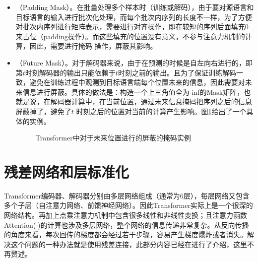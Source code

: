 \begin{itemize}
\vspace{0.5em}
\item {\small{}}（Padding Mask）。在批量处理多个样本时（训练或解码），由于要对源语言和目标语言的输入进行批次化处理，而每个批次内序列的长度不一样，为了方便对批次内序列进行矩阵表示，需要进行对齐操作，即在较短的序列后面填充0来占位（padding操作）。而这些填充的位置没有意义，不参与注意力机制的计算，因此，需要进行掩码 操作，屏蔽其影响。
\vspace{0.5em}
\item {\small{}}（Future Mask）。对于解码器来说，由于在预测的时候是自左向右进行的，即第$t$时刻解码器的输出只能依赖于$t$时刻之前的输出。且为了保证训练解码一致，避免在训练过程中观测到目标语言端每个位置未来的信息，因此需要对未来信息进行屏蔽。具体的做法是：构造一个上三角值全为-inf的Mask矩阵，也就是说，在解码器计算中，在当前位置，通过未来信息掩码把序列之后的信息屏蔽掉了，避免了$t$ 时刻之后的位置对当前的计算产生影响。图\ref{fig:12-13}给出了一个具体的实例。

\begin{figure}[htp]
\centering

\caption{Transformer中对于未来位置进行的屏蔽的掩码实例}
\label{fig:12-13}
\end{figure}

\vspace{0.5em}
\end{itemize}


\section{残差网络和层标准化}

\parinterval Transformer编码器、解码器分别由多层网络组成（通常为6层），每层网络又包含多个子层（自注意力网络、前馈神经网络）。因此Transformer实际上是一个很深的网络结构。再加上点乘注意力机制中包含很多线性和非线性变换；且注意力函数Attention($\cdot$)的计算也涉及多层网络，整个网络的信息传递非常复杂。从反向传播的角度来看，每次回传的梯度都会经过若干步骤，容易产生梯度爆炸或者消失。解决这个问题的一种办法就是使用残差连接，此部分内容已经在{\chapternine}进行了介绍，这里不再赘述。

